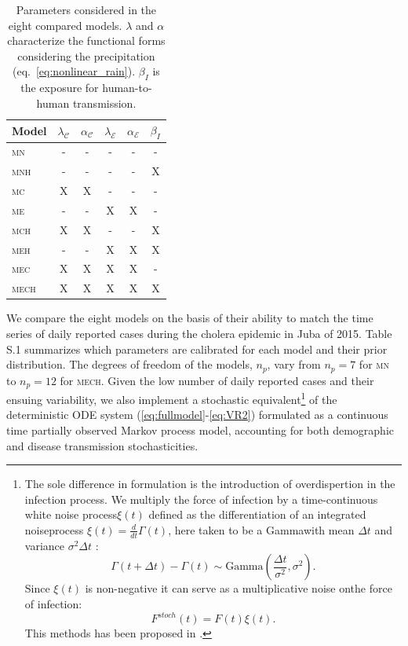 \begin{table}[h!]
\centering
\begin{tabular}{lccccc}
\toprule
     Model       & $\lambda_{\mathcal{C}}$ & $\alpha_\mathcal{C}$ & $\lambda_{\mathcal{E}}$ & $\alpha_\mathcal{E}$ & $\beta_I$   \\
    \hline
    \textsc{mn} &       -    &    -   &       -      &       -      &  - \\
    \textsc{mnh} &     -      &   -    &    -         &        -     &   X\\
    \textsc{mc} &       X   &   X   &     -        &       -      &  - \\
    \textsc{me} &         -  &   -    &       X     &    X         & -  \\
    \textsc{mch}&       X   &   X   &      -       &     -        & X  \\
    \textsc{meh}&        -   &  -     &       X     &    X         & X  \\
    \textsc{mec}&       X  &   X   &       X     &     X       & -\\
    \textsc{mech}&       X  &   X   &       X     &     X        &   X\\
\bottomrule
\end{tabular}
\caption{Parameters considered in the eight compared models.  $\lambda$ and $\alpha$ characterize the functional forms considering the precipitation (eq.~\ref{eq:nonlinear_rain}). $\beta_I$ is the exposure for human-to-human transmission.}
\label{tab:models}
\end{table}

We compare the eight models on the basis of their ability to match the time series of daily reported cases during the cholera epidemic in Juba of 2015. Table S.1 summarizes which parameters are calibrated for each model and their prior distribution. The degrees of freedom of the models, $n_p$, vary from $n_p=7$ for \textsc{mn} to $n_p=12$ for \textsc{mech}. Given the low number of daily reported cases and their ensuing variability, we also implement a stochastic equivalent\footnote[][-5\baselineskip]{The sole difference in formulation is the introduction of overdispertion in the infection process. We multiply the force of infection by a time-continuous white noise process\(\xi(t)\) defined as the differentiation of an integrated noiseprocess \(\xi(t) = \frac{d}{dt}\Gamma(t)\), here taken to be a Gammawith mean \(\Delta t\) and variance \(\sigma^2 \Delta t\) : \[
\Gamma (t+\Delta t) - \Gamma (t) \sim \text{Gamma}\left( \frac{\Delta t}{\sigma^2}, \sigma^2\right). \]
Since \(\xi(t)\) is non-negative it can serve as a multiplicative noise onthe force of infection: \[ F^{stoch}(t) = F(t) \xi(t). \]This methods has been proposed in .} of the deterministic ODE system (\ref{eq:fullmodel}-\ref{eq:VR2}) formulated as a continuous time partially observed Markov process model, accounting for both demographic and disease transmission stochasticities\cite{Breto:TimeSeriesAnalysis:2009}. 

